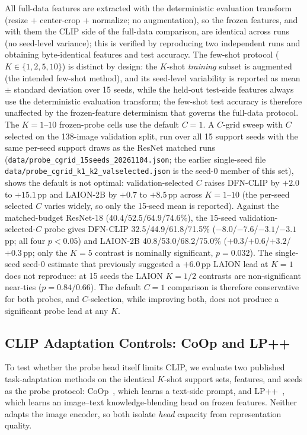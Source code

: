 \documentclass[10pt,a4paper]{article}
\begin{document}
All full-data features are extracted with the deterministic evaluation transform (resize + center-crop + normalize; no augmentation), so the frozen features, and with them the CLIP side of the full-data comparison, are identical across runs (no seed-level variance); this is verified by reproducing two independent runs and obtaining byte-identical features and test accuracy. The few-shot protocol ($K\in\{1,2,5,10\}$) is distinct by design: the $K$-shot \emph{training} subset is augmented (the intended few-shot method), and its seed-level variability is reported as mean $\pm$ standard deviation over 15 seeds, while the held-out test-side features always use the deterministic evaluation transform; the few-shot test accuracy is therefore unaffected by the frozen-feature determinism that governs the full-data protocol. The $K{=}1$--$10$ frozen-probe cells use the default $C{=}1$. A $C$-grid sweep with $C$ selected on the 138-image validation split, run over all 15 support seeds with the same per-seed support draws as the ResNet matched runs (\texttt{data/probe\_cgrid\_15seeds\_20261104.json}; the earlier single-seed file \texttt{data/probe\_cgrid\_k1\_k2\_valselected.json} is the seed-0 member of this set), shows the default is not optimal: validation-selected $C$ raises DFN-CLIP by $+2.0$ to $+15.1$\,pp and LAION-2B by $+0.7$ to $+8.5$\,pp across $K{=}1$--$10$ (the per-seed selected $C$ varies widely, so only the 15-seed mean is reported). Against the matched-budget ResNet-18 (40.4/52.5/64.9/74.6\%), the 15-seed validation-selected-$C$ probe gives DFN-CLIP 32.5/44.9/61.8/71.5\% ($-8.0$/$-7.6$/$-3.1$/$-3.1$\,pp; all four $p<0.05$) and LAION-2B 40.8/53.0/68.2/75.0\% ($+0.3$/$+0.6$/$+3.2$/$+0.3$\,pp; only the $K{=}5$ contrast is nominally significant, $p{=}0.032$). The single-seed seed-0 estimate that previously suggested a $+6.0$\,pp LAION lead at $K{=}1$ does not reproduce: at 15 seeds the LAION $K{=}1/2$ contrasts are non-significant near-ties ($p{=}0.84/0.66$). The default $C{=}1$ comparison is therefore conservative for both probes, and $C$-selection, while improving both, does not produce a significant probe lead at any $K$.

\subsection{CLIP Adaptation Controls: CoOp and LP++}

To test whether the probe head itself limits CLIP, we evaluate two published task-adaptation methods on the identical $K$-shot support sets, features, and seeds as the probe protocol: CoOp~\cite{zhou2022learning}, which learns a text-side prompt, and LP++~\cite{lpplus}, which learns an image--text knowledge-blending head on frozen features. Neither adapts the image encoder, so both isolate \emph{head} capacity from representation quality.
\end{document}
